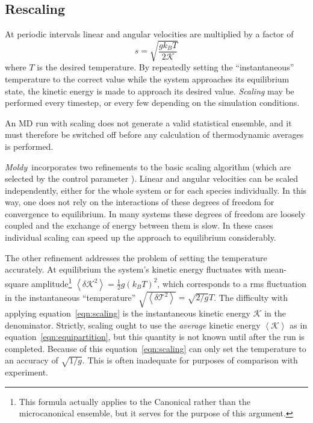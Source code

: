 \documentclass[a4paper,twoside]{report}
\newcommand{\moldy}{\emph{Moldy}}
\begin{document}
\subsection{Rescaling}
\label{sec:rescaling}

At periodic intervals linear and
angular velocities are multiplied by a factor of
\begin{equation}
\label{eqn:scaling}
s = \sqrt{\frac{gk_BT}{2\mathcal K}}
\end{equation}
where $T$ is the desired temperature.  By repeatedly setting the
``instantaneous'' temperature to the correct value while the system
approaches its equilibrium state, the kinetic energy is made to
approach its desired value.  \emph{Scaling} may be performed every
timestep, or every few depending on the simulation conditions.

An MD run with scaling does not generate a valid statistical ensemble,
and it must therefore be switched off before any calculation of
thermodynamic averages is performed.

\moldy\ incorporates two refinements to the basic scaling algorithm
(which are selected by the control parameter ).
Linear and angular velocities can be scaled independently, either for
the whole system or for each species individually.  In this way, one
does not rely on the interactions of these degrees of freedom for
convergence to equilibrium.  In many systems these degrees of freedom
are loosely coupled and the exchange of energy between them is slow.
In these cases individual scaling can speed up the approach to
equilibrium considerably.

The other refinement addresses the problem of setting the temperature
accurately.  At equilibrium the system's kinetic energy fluctuates
with mean-square amplitude\footnote{This formula actually applies to
the Canonical rather than the microcanonical ensemble, but it serves
for the purpose of this argument.} $\left < \delta {\mathcal K}^2\right > =
\frac{1}{2}g\left(k_BT\right)^2$, which corresponds to a
rms fluctuation in the instantaneous ``temperature'' 
$\sqrt{\left < \delta {\mathcal T}^2\right >} = 
\sqrt{2 /g} T$.   
The difficulty with applying equation~\ref{eqn:scaling}
is the instantaneous kinetic energy $\mathcal K$ in the denominator.
Strictly, scaling ought to use the \emph{average} kinetic energy
$\left<\mathcal K \right>$ as in equation~\ref{eqn:equipartition}, but
this quantity is not known until after the run is completed.  Because
of this equation~\ref{eqn:scaling} can only set the temperature to an
accuracy of $\sqrt{1/g}$.  This is often inadequate for purposes of
comparison with experiment.
\end{document}
